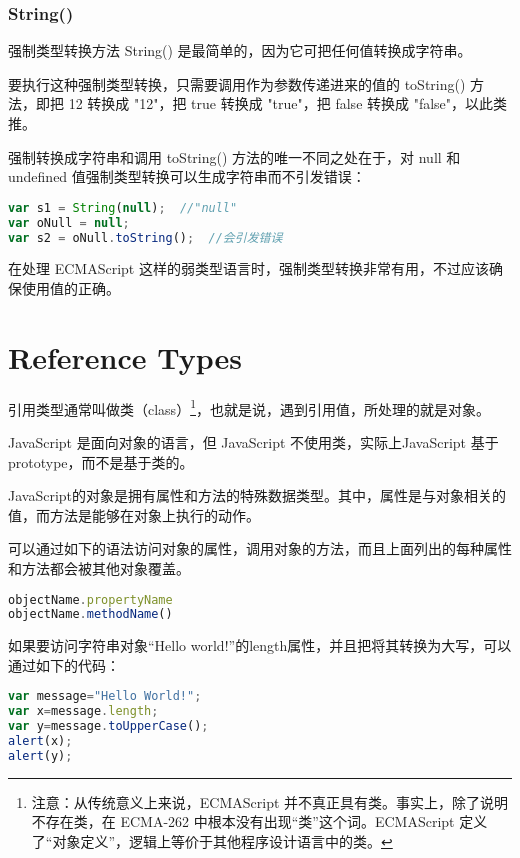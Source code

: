\subsection{String()}

强制类型转换方法 String() 是最简单的，因为它可把任何值转换成字符串。


要执行这种强制类型转换，只需要调用作为参数传递进来的值的 toString() 方法，即把 12 转换成 "12"，把 true 转换成 "true"，把 false 转换成 "false"，以此类推。

强制转换成字符串和调用 toString() 方法的唯一不同之处在于，对 null 和 undefined 值强制类型转换可以生成字符串而不引发错误：


\begin{lstlisting}[language=JavaScript]
var s1 = String(null);	//"null"
var oNull = null;
var s2 = oNull.toString();	//会引发错误
\end{lstlisting}

在处理 ECMAScript 这样的弱类型语言时，强制类型转换非常有用，不过应该确保使用值的正确。




\chapter{Reference Types}

引用类型通常叫做类（class）\footnote{注意：从传统意义上来说，ECMAScript 并不真正具有类。事实上，除了说明不存在类，在 ECMA-262 中根本没有出现“类”这个词。ECMAScript 定义了“对象定义”，逻辑上等价于其他程序设计语言中的类。}，也就是说，遇到引用值，所处理的就是对象。

JavaScript 是面向对象的语言，但 JavaScript 不使用类，实际上JavaScript 基于 prototype，而不是基于类的。

JavaScript的对象是拥有属性和方法的特殊数据类型。其中，属性是与对象相关的值，而方法是能够在对象上执行的动作。

可以通过如下的语法访问对象的属性，调用对象的方法，而且上面列出的每种属性和方法都会被其他对象覆盖。

\begin{lstlisting}[language=JavaScript]
objectName.propertyName
objectName.methodName()
\end{lstlisting}

如果要访问字符串对象“Hello world!”的length属性，并且把将其转换为大写，可以通过如下的代码：


\begin{lstlisting}[language=JavaScript]
var message="Hello World!";
var x=message.length;
var y=message.toUpperCase();
alert(x);
alert(y);
\end{lstlisting}

